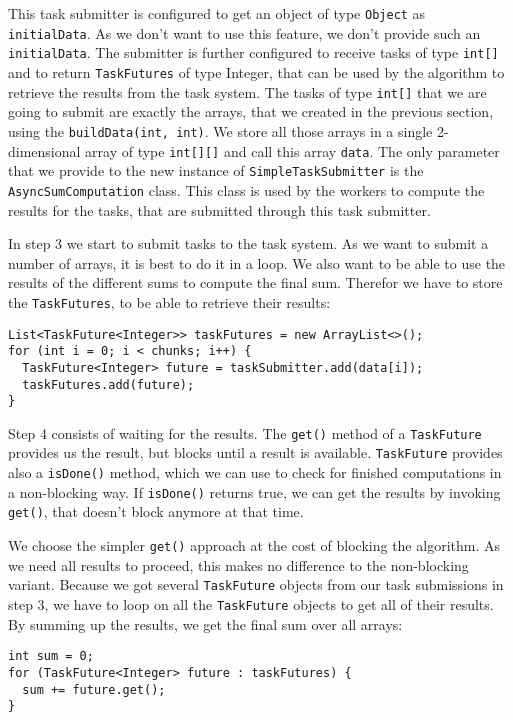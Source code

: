   This task submitter is configured to get an object of type \texttt{Object} as \texttt{initialData}. As we don't want to use this feature, we don't provide such an \texttt{initialData}. The submitter is further configured to receive tasks of type \texttt{int[]} and to return \texttt{TaskFutures} of type {Integer}, that can be used by the algorithm to retrieve the results from the task system. The tasks of type \texttt{int[]} that we are going to submit are exactly the arrays, that we created in the previous section, using the \texttt{buildData(int, int)}. We store all those arrays in a single 2-dimensional array of type \texttt{int[][]} and call this array \texttt{data}. The only parameter that we provide to the new instance of \texttt{SimpleTaskSubmitter} is the \texttt{AsyncSumComputation} class. This class is used by the workers to compute the results for the tasks, that are submitted through this task submitter.

  In step 3 we start to submit tasks to the task system. As we want to submit a number of arrays, it is best to do it in a loop. We also want to be able to use the results of the different sums to compute the final sum. Therefor we have to store the \texttt{TaskFutures}, to be able to retrieve their results:
  
  \begin{lstlisting}
List<TaskFuture<Integer>> taskFutures = new ArrayList<>();
for (int i = 0; i < chunks; i++) {
  TaskFuture<Integer> future = taskSubmitter.add(data[i]);
  taskFutures.add(future);
}
  \end{lstlisting}
  
  Step 4 consists of waiting for the results. The \texttt{get()} method of a \texttt{TaskFuture} provides us the result, but blocks until a result is available. \texttt{TaskFuture} provides also a \texttt{isDone()} method, which we can use to check for finished computations in a non-blocking way. If \texttt{isDone()} returns true, we can get the results by invoking \texttt{get()}, that doesn't block anymore at that time.
  
  We choose the simpler \texttt{get()} approach at the cost of blocking the algorithm. As we need all results to proceed, this makes no difference to the non-blocking variant. Because we got several \texttt{TaskFuture} objects from our task submissions in step 3, we have to loop on all the \texttt{TaskFuture} objects to get all of their results. By summing up the results, we get the final sum over all arrays:
  
  \begin{lstlisting}
int sum = 0;
for (TaskFuture<Integer> future : taskFutures) {
  sum += future.get();
}
  \end{lstlisting}
  
